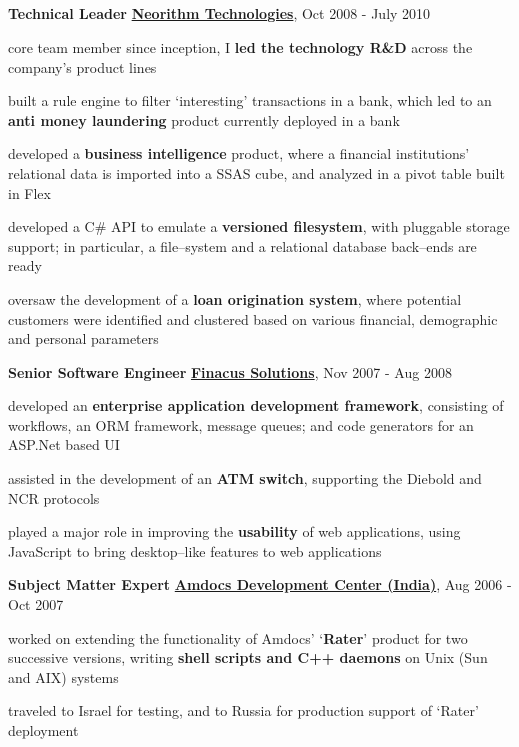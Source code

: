 \documentclass[a4paper,11pt,final]{article}
\newcommand{\resumetitle}[1]{%
  \subsection*{%
    \large\sc{#1}%
    \normalsize
  }%
  
}%
\newcommand{\jobexp}[5]{%
  \textbf{{#4}}
  \hfill
  \textbf{\href{#2}{#1}}, {#3}
  \\\vspace{-12pt}%
}
\newcommand{\resumedescheader}[1]{%
  \smallskip%
  \resumetitle{#1}
}%
\begin{document}
\resumedescheader{Career}
\jobexp
	{Neorithm Technologies}
	{http://www.neorithm.com}
	{Oct 2008 - July 2010}
	{Technical Leader}
	{Core team member since inception, led the technology R\&D across the company's product lines}
\begin{itemize*}
\item core team member since inception, I \textbf{led the technology R\&D} across the company's product lines
\item built a rule engine to filter `interesting' transactions in a bank, which led to an \textbf{anti money laundering} product currently deployed in a bank
\item developed a \textbf{business intelligence} product, where a financial institutions' relational data is imported into a SSAS cube, and analyzed in a pivot table built in Flex
\item developed a C\# API to emulate a \textbf{versioned filesystem}, with pluggable storage support; in particular, a file--system and a relational database back--ends are ready
\item oversaw the development of a \textbf{loan origination system}, where potential customers were identified and clustered based on various financial, demographic and personal parameters
\end{itemize*}
\vspace{5pt}
\jobexp
	{Finacus Solutions}
	{http://www.finacus.com}
	{Nov 2007 - Aug 2008}
	{Senior Software Engineer}
	{Core team member, enabled rapid application development with an in-house framework}
\begin{itemize*}
\item developed an \textbf{enterprise application development framework}, consisting of workflows, an ORM framework, message queues; and code generators for an ASP.Net based UI
\item assisted in the development of an \textbf{ATM switch}, supporting the Diebold and NCR protocols
\item played a major role in improving the \textbf{usability} of web applications, using JavaScript to bring desktop--like features to web applications
\end{itemize*}
\vspace{5pt}
\jobexp
	{Amdocs Development Center (India)}
	{http://www.amdocs.com}
	{Aug 2006 - Oct 2007}
	{Subject Matter Expert}
	{Implemented Amdocs' telecom billing functionality using Unix processes}
\begin{itemize*}
\item worked on extending the functionality of Amdocs' `\textbf{Rater}' product for two successive versions, writing \textbf{shell scripts and C++ daemons} on Unix (Sun and AIX) systems
\item traveled to Israel for testing, and to Russia for production support of `Rater' deployment
\end{itemize*}
\end{document}
